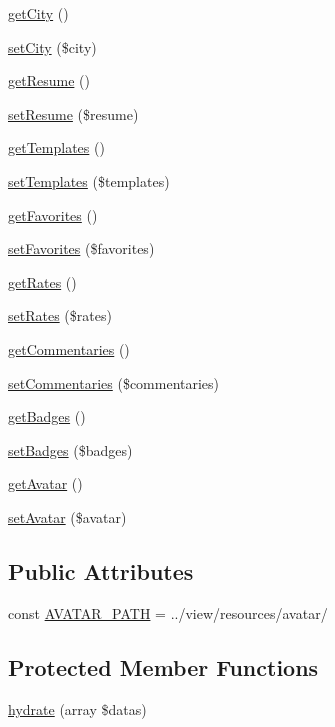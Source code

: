 \begin{DoxyCompactItemize}
\item 
\hyperlink{classUser_a2f3d365f258ab5eb076de5bc05352c1d}{get\+City} ()
\item 
\hyperlink{classUser_ab8768756245b320f58e41e7720261806}{set\+City} (\$city)
\item 
\hyperlink{classUser_a3fdd56ceb1e13d15b8275e0768b70a1d}{get\+Resume} ()
\item 
\hyperlink{classUser_a65c272bd5f7584dc63f440d2aed03e0f}{set\+Resume} (\$resume)
\item 
\hyperlink{classUser_a9840344fcf0330ef04b97828230c467a}{get\+Templates} ()
\item 
\hyperlink{classUser_a415acec558cfd5718e78517e322521fc}{set\+Templates} (\$templates)
\item 
\hyperlink{classUser_ad2d88cd0c79186c35350c65b0f036994}{get\+Favorites} ()
\item 
\hyperlink{classUser_a4424e203b73cf754c75a1bc0857cc3f9}{set\+Favorites} (\$favorites)
\item 
\hyperlink{classUser_a03c6f88dd5a3186227e0d89d2fe7dcc2}{get\+Rates} ()
\item 
\hyperlink{classUser_a677f8b1c525aa3c169dcc555168d8c45}{set\+Rates} (\$rates)
\item 
\hyperlink{classUser_afe55a9dab992f7ccfa9de1a8f6c908d8}{get\+Commentaries} ()
\item 
\hyperlink{classUser_ac0ff27868021b69c7224c693c7fcc49b}{set\+Commentaries} (\$commentaries)
\item 
\hyperlink{classUser_a3310fd79fdb53a61c3270fe5b533e0d9}{get\+Badges} ()
\item 
\hyperlink{classUser_ac95a2195f0c31c37cbd71695083a2944}{set\+Badges} (\$badges)
\item 
\hyperlink{classUser_a40a44c81f2ba62b1045edda618ae029d}{get\+Avatar} ()
\item 
\hyperlink{classUser_a844421f74da565923b63bb44f387e495}{set\+Avatar} (\$avatar)
\end{DoxyCompactItemize}
\subsection*{Public Attributes}
\begin{DoxyCompactItemize}
\item 
const \hyperlink{classUser_a3d0169a66a924f3be81934070fe9cc5d}{A\+V\+A\+T\+A\+R\+\_\+\+P\+A\+TH} = \textquotesingle{}../view/resources/avatar/\textquotesingle{}
\end{DoxyCompactItemize}
\subsection*{Protected Member Functions}
\begin{DoxyCompactItemize}
\item 
\hyperlink{classUser_a3380b9274ee3d0eab7a522dd237ad34f}{hydrate} (array \$datas)
\end{DoxyCompactItemize}


